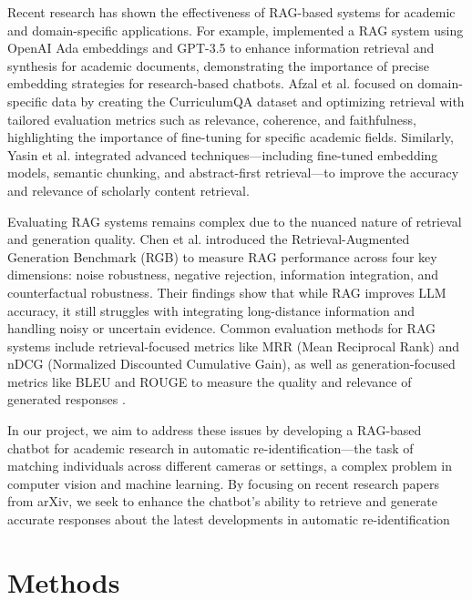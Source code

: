 \documentclass[fleqn,moreauthors,10pt]{ds_report}
\begin{document}
Recent research has shown the effectiveness of RAG-based systems for academic and domain-specific applications. For example, \cite{Chatbots_in_Academia} implemented a RAG system using OpenAI Ada embeddings and GPT-3.5 to enhance information retrieval and synthesis for academic documents, demonstrating the importance of precise embedding strategies for research-based chatbots. Afzal et al. \cite{afzal2024towards} focused on domain-specific data by creating the CurriculumQA dataset and optimizing retrieval with tailored evaluation metrics such as relevance, coherence, and faithfulness, highlighting the importance of fine-tuning for specific academic fields. Similarly, Yasin et al. \cite{yasin2024retrieval} integrated advanced techniques—including fine-tuned embedding models, semantic chunking, and abstract-first retrieval—to improve the accuracy and relevance of scholarly content retrieval.

Evaluating RAG systems remains complex due to the nuanced nature of retrieval and generation quality. Chen et al. \cite{chen2024benchmarking} introduced the Retrieval-Augmented Generation Benchmark (RGB) to measure RAG performance across four key dimensions: noise robustness, negative rejection, information integration, and counterfactual robustness. Their findings show that while RAG improves LLM accuracy, it still struggles with integrating long-distance information and handling noisy or uncertain evidence. Common evaluation methods for RAG systems include retrieval-focused metrics like MRR (Mean Reciprocal Rank) and nDCG (Normalized Discounted Cumulative Gain), as well as generation-focused metrics like BLEU and ROUGE to measure the quality and relevance of generated responses \cite{lewis2020rag}.

In our project, we aim to address these issues by developing a RAG-based chatbot for academic research in automatic re-identification—the task of matching individuals across different cameras or settings, a complex problem in computer vision and machine learning. By focusing on recent research papers from arXiv, we seek to enhance the chatbot’s ability to retrieve and generate accurate responses about the latest developments in automatic re-identification


\section*{Methods}
\end{document}
